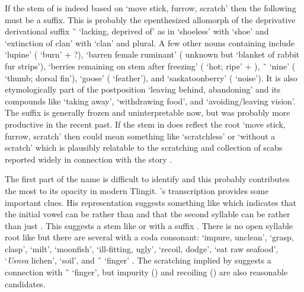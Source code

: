 If the stem of  is indeed  based on  ‘move stick, furrow, scratch’ then the following  must be a suffix.
This is probably the epenthesized allomorph of the deprivative derivational suffix  \~\  ‘lacking, deprived of’ as in  ‘shoeless’ with  ‘shoe’ and  ‘extinction of clan’ with  ‘clan’ and  plural.
A few other nouns containing  include  ‘lupine’ ( ‘burn’ + ?),  ‘barren female ruminant’ ( unknown but  ‘blanket of rabbit fur strips’),  ‘berries remaining on stem after freezing’ ( ‘hot; ripe’ + ),  \~\  ‘nine’ ( ‘thumb; dorsal fin’),  ‘goose’ ( ‘feather’), and  ‘saskatoonberry’ ( ‘noise’).
It is also etymologically part of the postposition  ‘leaving behind, abandoning’ and its compounds like  ‘taking away’,  ‘withdrawing food’, and  ‘avoiding/leaving vision’.
The suffix  is generally frozen and uninterpretable now, but was probably more productive in the recent past.
If the stem  in  does reflect the root  ‘move stick, furrow, scratch’ then  could mean something like ‘scratchless’ or ‘without a scratch’ which is plausibly relatable to the scratching and collection of scabs reported widely in connection with the story \parencites[821]{de-laguna:1972}[572]{mcclellan:1975b}.

The first part of the name  is difficult to identify and this probably contributes the most to its opacity in modern Tlingit.
\citeauthor{swanton:1909}’s transcription  provides some important clues.
His representation suggests something like  which indicates that the initial vowel can be  rather than  and that the second syllable can be  rather than just .
This suggests a stem like  or  with a suffix .
There is no open syllable root like  but there are several with a coda consonant:  ‘impure, unclean’,  ‘grasp, clasp’,  ‘milt’,  ‘moonfish’,  ‘ill-fitting, ugly’,  ‘recoil, dodge’,  ‘eat raw seafood’,  ‘\textit{Usnea} lichen’,  ‘soil’, and  \~\  ‘finger’ \parencite[35]{leer:1978b}.
The scratching implied by  suggests a connection with  \~\  ‘finger’, but impurity () and recoiling () are also reasonable candidates.

